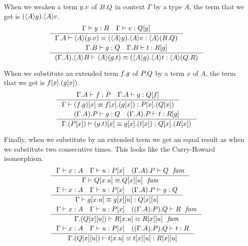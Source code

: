 When we weaken a term $\ctxext{y}{v}$ of $\ctxext{B}{Q}$ in context $\Gamma$ by
a type $A$, the term that we get is $\ctxext{\ctxwk{A}{y}}{\ctxwk{A}{v}}$.
\begin{align}
& \inference{\jterm{\Gamma}{B}{y}\quad\jterm{\Gamma}{\subst{y}{Q}}{v}}{\jtermeq{\ctxext{\Gamma}{A}}{\ctxwk{A}{\ctxext{B}{Q}}}{\ctxwk{A}{\ctxext{y}{v}}}{\ctxext{\ctxwk{A}{y}}{\ctxwk{A}{v}}}}\\
& \inference{\jterm{\ctxext{\Gamma}{B}}{Q}{g}\quad\jterm{\ctxext{\Gamma}{B}}{\subst{g}{R}}{t}}{\jtermeq{\ctxext{{\Gamma}{A}}{\ctxwk{A}{B}}}{\ctxwk{A}{\ctxext{Q}{R}}}{\ctxwk{A}{\ctxext{g}{t}}}{\ctxext{\ctxwk{A}{g}}{\ctxwk{A}{t}}}}
\end{align}

When we substitute an extended term $\ctxext{f}{g}$ of $\ctxext{P}{Q}$ by a term
$x$ of $A$, the term that we get is $\ctxext{\subst{x}{f}}{\subst{x}{g}}$.
\begin{align}
& \inference{\jterm{\ctxext{\Gamma}{A}}{P}{f}\quad\jterm{\ctxext{\Gamma}{A}}{\subst{f}{Q}}{g}}{\jtermeq{\Gamma}{\ctxext{\subst{x}{P}}{\subst{x}{Q}}}{\subst{x}{\ctxext{f}{g}}}{\ctxext{\subst{x}{f}}{\subst{x}{g}}}}\\
& \inference{\jterm{\ctxext{{\Gamma}{A}}{P}}{Q}{g}\quad\jterm{\ctxext{{\Gamma}{A}}{P}}{\subst{g}{R}}{t}}{\jtermeq{\ctxext{\Gamma}{\subst{x}{P}}}{\ctxext{\subst{x}{Q}}{\subst{x}{R}}}{\subst{x}{\ctxext{g}{t}}}{\ctxext{\subst{x}{g}}{\subst{x}{t}}}}
\end{align}

Finally, when we substitute by an extended term we get an equal result as when we
substitute two consecutive times. This looks like the Curry-Howard isomorphism.
\begin{align}
& \inference{\jterm{\Gamma}{A}{x}\quad\jterm{\Gamma}{\subst{x}{P}}{u}\quad\jfam{\ctxext{{\Gamma}{A}}{P}}{Q}}
  {\jfameq{\Gamma}{\subst{\ctxext{x}{u}}{Q}}{\subst{u}{{x}{Q}}}}\\
& \inference{\jterm{\Gamma}{A}{x}\quad\jterm{\Gamma}{\subst{x}{P}}{u}\quad\jterm{\ctxext{{\Gamma}{A}}{P}}{Q}{g}}
  {\jtermeq{\Gamma}{\subst{u}{{x}{Q}}}{\subst{\ctxext{x}{u}}{g}}{\subst{u}{{x}{g}}}}\\
& \inference{\jterm{\Gamma}{A}{x}\quad\jterm{\Gamma}{\subst{x}{P}}{u}\quad\jfam{\ctxext{{{\Gamma}{A}}{P}}{Q}}{R}}
  {\jfameq{\ctxext{\Gamma}{\subst{u}{{x}{Q}}}}{\subst{\ctxext{x}{u}}{R}}{\subst{u}{{x}{R}}}}\\
& \inference{\jterm{\Gamma}{A}{x}\quad\jterm{\Gamma}{\subst{x}{P}}{u}\quad\jterm{\ctxext{{{\Gamma}{A}}{P}}{Q}}{R}{t}}
  {\jtermeq{\ctxext{\Gamma}{\subst{u}{{x}{Q}}}}{\subst{u}{{x}{R}}}{\subst{\ctxext{x}{u}}{t}}{\subst{u}{{x}{t}}}}
\end{align}

